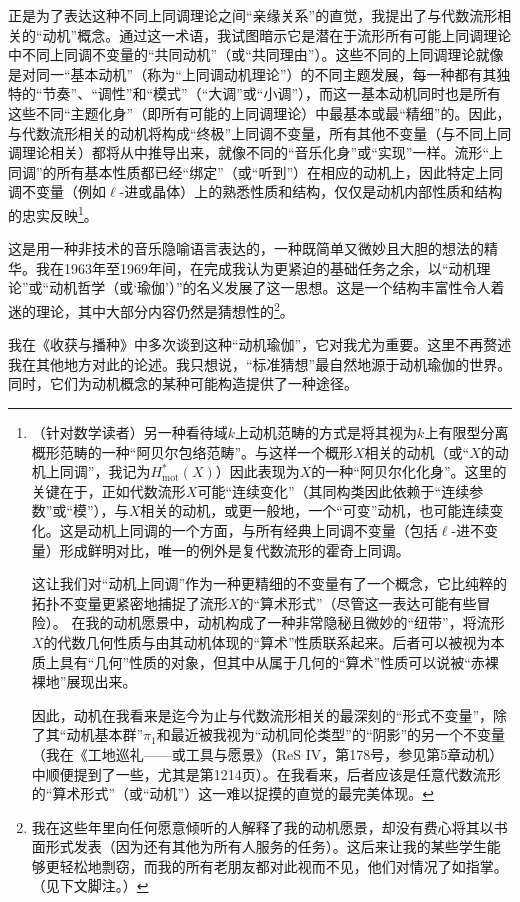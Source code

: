 正是为了表达这种不同上同调理论之间“亲缘关系”的直觉，我提出了与代数流形相关的“动机”概念。通过这一术语，我试图暗示它是潜在于流形所有可能上同调理论中不同上同调不变量的“共同动机”（或“共同理由”）。这些不同的上同调理论就像是对同一“基本动机”（称为“上同调动机理论”）的不同主题发展，每一种都有其独特的“节奏”、“调性”和“模式”（“大调”或“小调”），而这一基本动机同时也是所有这些不同“主题化身”（即所有可能的上同调理论）中最基本或最“精细”的。因此，与代数流形相关的动机将构成“终极”上同调不变量，所有其他不变量（与不同上同调理论相关）都将从中推导出来，就像不同的“音乐化身”或“实现”一样。流形“上同调”的所有基本性质都已经“绑定”（或“听到”）在相应的动机上，因此特定上同调不变量（例如$\ell$-进或晶体）上的熟悉性质和结构，仅仅是动机内部性质和结构的忠实反映\footnote{（针对数学读者）另一种看待域$k$上动机范畴的方式是将其视为$k$上有限型分离概形范畴的一种“阿贝尔包络范畴”。与这样一个概形$X$相关的动机（或“$X$的动机上同调”，我记为$H_{\text {mot}}^{*}(X)$）因此表现为$X$的一种“阿贝尔化化身”。这里的关键在于，正如代数流形$X$可能“连续变化”（其同构类因此依赖于“连续参数”或“模”），与$X$相关的动机，或更一般地，一个“可变”动机，也可能连续变化。这是动机上同调的一个方面，与所有经典上同调不变量（包括$\ell$-进不变量）形成鲜明对比，唯一的例外是复代数流形的霍奇上同调。

这让我们对“动机上同调”作为一种更精细的不变量有了一个概念，它比纯粹的拓扑不变量更紧密地捕捉了流形$X$的“算术形式”（尽管这一表达可能有些冒险）。
在我的动机愿景中，动机构成了一种非常隐秘且微妙的“纽带”，将流形$X$的代数几何性质与由其动机体现的“算术”性质联系起来。后者可以被视为本质上具有“几何”性质的对象，但其中从属于几何的“算术”性质可以说被“赤裸裸地”展现出来。

因此，动机在我看来是迄今为止与代数流形相关的最深刻的“形式不变量”，除了其“动机基本群”$\pi_1$和最近被我视为“动机同伦类型”的“阴影”的另一个不变量（我在《工地巡礼——或工具与愿景》（ReS IV，第178号，参见第5章动机）中顺便提到了一些，尤其是第1214页）。在我看来，后者应该是任意代数流形的“算术形式”（或“动机”）这一难以捉摸的直觉的最完美体现。}。

这是用一种非技术的音乐隐喻语言表达的，一种既简单又微妙且大胆的想法的精华。我在1963年至1969年间，在完成我认为更紧迫的基础任务之余，以“动机理论”或“动机哲学（或‘瑜伽’）”的名义发展了这一思想。这是一个结构丰富性令人着迷的理论，其中大部分内容仍然是猜想性的\footnote{我在这些年里向任何愿意倾听的人解释了我的动机愿景，却没有费心将其以书面形式发表（因为还有其他为所有人服务的任务）。这后来让我的某些学生能够更轻松地剽窃，而我的所有老朋友都对此视而不见，他们对情况了如指掌。（见下文脚注。）}。

我在《收获与播种》中多次谈到这种“动机瑜伽”，它对我尤为重要。这里不再赘述我在其他地方对此的论述。我只想说，“标准猜想”最自然地源于动机瑜伽的世界。同时，它们为动机概念的某种可能构造提供了一种途径。

